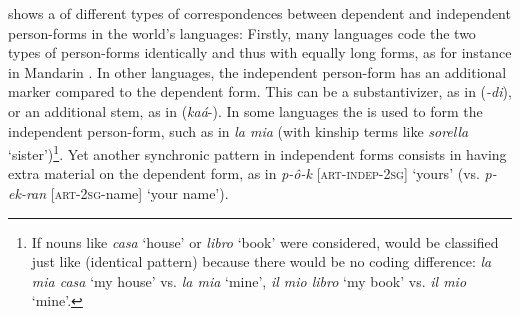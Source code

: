 \documentclass[output=paper]{langsci/langscibook}
\begin{document}
 shows a  of different types of correspondences between dependent and independent person-forms in the world's languages: Firstly, many languages code the two types of person-forms identically and thus with equally long forms, as for instance in Mandarin . In other languages, the independent person-form has an additional marker compared to the dependent form. This can be a substantivizer, as in  (\textit{{}-di}), or an additional stem, as in  (\textit{kaá}{}-). In some languages the   is used to form the independent person-form, such as in  \textit{la mia} (with kinship terms like \textit{sorella} ‘sister’)\footnote{If nouns like \textit{casa} ‘house’ or \textit{libro} ‘book’ were considered,  would be classified just like  (identical pattern) because there would be no coding difference: \textit{la mia casa} ‘my house’ vs. \textit{la mia} ‘mine’, \textit{il mio libro} ‘my book’ vs. \textit{il mio} ‘mine’.}. Yet another synchronic pattern in independent  forms consists in having extra material on the dependent form, as in  \textit{p-ô-k} [\textsc{art-indep-2sg}] ‘yours’ (vs. \textit{p-ek-ran} [\textsc{art-2sg}{}-name] ‘your name’).
\end{document}
